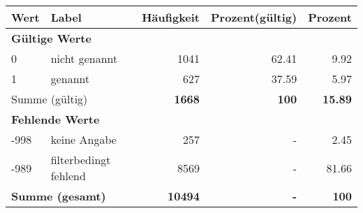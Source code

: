      \begin{longtable}{lXrrr}
     \toprule
     \textbf{Wert} & \textbf{Label} & \textbf{Häufigkeit} & \textbf{Prozent(gültig)} & \textbf{Prozent} \\
     \endhead
     \midrule
     \multicolumn{5}{l}{\textbf{Gültige Werte}}\\

     0 &
     \multicolumn{1}{X}{ nicht genannt   } &


       \num{1041} &
       \num[round-mode=places,round-precision=2]{62.41} &
         \num[round-mode=places,round-precision=2]{9.92} \\

     1 &
     \multicolumn{1}{X}{ genannt   } &


       \num{627} &
       \num[round-mode=places,round-precision=2]{37.59} &
         \num[round-mode=places,round-precision=2]{5.97} \\
     \midrule
     \multicolumn{2}{l}{Summe (gültig)} &
       \textbf{\num{1668}} &
     \textbf{\num{100}} &
       \textbf{\num[round-mode=places,round-precision=2]{15.89}} \\
     \multicolumn{5}{l}{\textbf{Fehlende Werte}}\\
       -998 &
       keine Angabe &
         \num{257} &
        - &
         \num[round-mode=places,round-precision=2]{2.45} \\
       -989 &
       filterbedingt fehlend &
         \num{8569} &
        - &
         \num[round-mode=places,round-precision=2]{81.66} \\
     \midrule
     \multicolumn{2}{l}{\textbf{Summe (gesamt)}} &
          \textbf{\num{10494}} &
        \textbf{-} &
        \textbf{\num{100}} \\
     \bottomrule
     \end{longtable}
     
